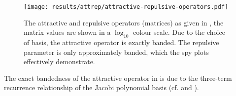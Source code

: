 \begin{figure}[H]
  \centering
  \texttt{[image: results/attrep/attractive-repulsive-operators.pdf]}
  \caption[Attractive and repulsive operators.]{The attractive and repulsive operators (matrices) as given in , the matrix values are shown in a $\log_{10}$ colour scale. Due to the choice of basis, the attractive operator is exactly banded. The repulsive parameter is only approximately banded, which the spy plots effectively demonstrate.}
  \label{fig:attractive-repulsive}
\end{figure}

The exact bandedness of the attractive operator in  is due to the three-term recurrence relationship of the Jacobi polynomial basis (cf.  and ).
